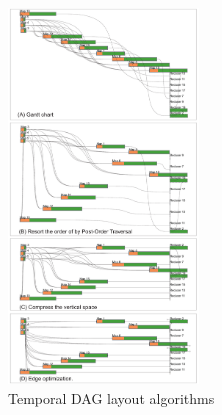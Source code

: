 \begin{figure}[t]
	\centering
	\includegraphics[width=0.45\textwidth]{figures/visualization/exeprogress.pdf}
	\vspace{-3mm}
	\caption{Temporal DAG layout algorithms}
	\label{fig:layout}
	\vspace{-3mm}
\end{figure}

